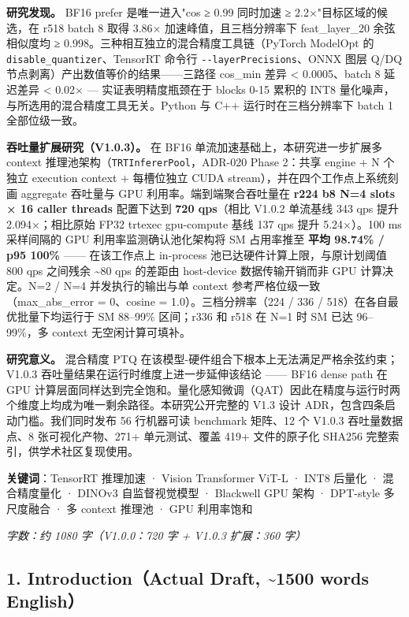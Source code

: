 \documentclass[
]{article}
\begin{document}
\textbf{研究发现。} BF16 prefer 是唯一进入"cos ≥ 0.99 同时加速 ≥
2.2×"目标区域的候选，在 r518 batch 8 取得 3.86× 加速峰值，且三档分辨率下
feat\_layer\_20 余弦相似度均 ≥
0.998。三种相互独立的混合精度工具链（PyTorch ModelOpt 的
\texttt{disable\_quantizer}、TensorRT 命令行
\texttt{-\/-layerPrecisions}、ONNX 图层 Q/DQ
节点剥离）产出数值等价的结果------三路径 cos\_min 差异 \textless{}
0.0005、batch 8 延迟差异 \textless{} 0.02× --- 实证表明精度瓶颈在于
blocks 0-15 累积的 INT8 量化噪声，与所选用的混合精度工具无关。Python 与
C++ 运行时在三档分辨率下 batch 1 全部位级一致。

\textbf{吞吐量扩展研究（V1.0.3）。} 在 BF16
单流加速基础上，本研究进一步扩展多 context
推理池架构（\texttt{TRTInfererPool}，ADR-020 Phase 2：共享 engine + N
个独立 execution context + 每槽位独立 CUDA
stream），并在四个工作点上系统刻画 aggregate 吞吐量与 GPU
利用率。端到端聚合吞吐量在 \textbf{r224 b8 N=4 slots × 16 caller
threads} 配置下达到 \textbf{720 qps}（相比 V1.0.2 单流基线 343 qps 提升
2.094×；相比原始 FP32 trtexec gpu-compute 基线 137 qps 提升 5.24×）。100
ms 采样间隔的 GPU 利用率监测确认池化架构将 SM 占用率推至 \textbf{平均
98.74\% / p95 100\%} ------ 在该工作点上 in-process
池已达硬件计算上限，与原计划阈值 800 qps 之间残余 \textasciitilde80 qps
的差距由 host-device 数据传输开销而非 GPU 计算决定。N=2 / N=4
并发执行的输出与单 context 参考严格位级一致（max\_abs\_error = 0、cosine
= 1.0）。三档分辨率（224 / 336 / 518）在各自最优批量下均运行于 SM
88--99\% 区间；r336 和 r518 在 N=1 时 SM 已达 96--99\%，多 context
无空闲计算可填补。

\textbf{研究意义。} 混合精度 PTQ
在该模型-硬件组合下根本上无法满足严格余弦约束；V1.0.3
吞吐量结果在运行时维度上进一步延伸该结论 ------ BF16 dense path 在 GPU
计算层面同样达到完全饱和。量化感知微调（QAT）因此在精度与运行时两个维度上均成为唯一剩余路径。本研究公开完整的
V1.3 设计 ADR，包含四条启动门槛。我们同时发布 56 行机器可读 benchmark
矩阵、12 个 V1.0.3 吞吐量数据点、8 张可视化产物、271+ 单元测试、覆盖
419+ 文件的原子化 SHA256 完整索引，供学术社区复现使用。

\textbf{关键词}：TensorRT 推理加速 · Vision Transformer ViT-L · INT8
后量化 · 混合精度量化 · DINOv3 自监督视觉模型 · Blackwell GPU 架构 ·
DPT-style 多尺度融合 · 多 context 推理池 · GPU 利用率饱和

\emph{字数：约 1080 字（V1.0.0：720 字 + V1.0.3 扩展：360 字）}

\subsection{1. Introduction（Actual Draft, \textasciitilde1500 words
English）}\label{1-introductionactual-draft-1500-words-english}
\end{document}
